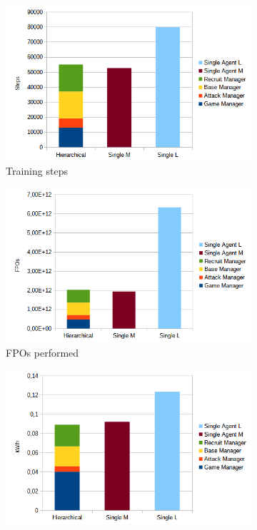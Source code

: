 \begin{figure}[t]
    \centering
    \begin{subfigure}[b]{0.495\textwidth}
        \includegraphics[width=1\textwidth]{figs/training_steps.png}
        \caption{Training steps}
    \end{subfigure}
    \begin{subfigure}[b]{0.495\textwidth}
        \includegraphics[width=1\textwidth]{figs/training_fpos.png}
        \caption{FPOs performed}
    \end{subfigure}
    \begin{subfigure}[b]{0.495\textwidth}
        \includegraphics[width=1\textwidth]{figs/training_energy.png}

\end{subfigure}
\end{figure}
